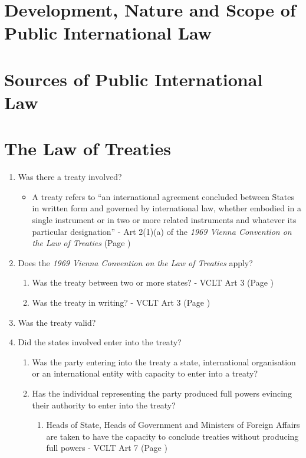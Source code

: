 \section{Development, Nature and Scope of Public International Law}

\section{Sources of Public International Law}

\section{The Law of Treaties}
\begin{enumerate}
    \item Was there a treaty involved?
    \begin{itemize}
        \item A treaty refers to ``an international agreement concluded between States in written form and governed by international law, whether embodied in a single instrument or in two or more related instruments and whatever its particular designation'' - Art 2(1)(a) of the \textit{1969 Vienna Convention on the Law of Treaties} (Page \pageref{VCLT Art 2})
    \end{itemize}
    \item Does the \textit{1969 Vienna Convention on the Law of Treaties} apply?
    \begin{enumerate}
        \item Was the treaty between two or more states? - VCLT Art 3 (Page \pageref{VCLT Art 3})
        \item Was the treaty in writing? - VCLT Art 3 (Page \pageref{VCLT Art 3})
    \end{enumerate}
    \item Was the treaty valid?
    \item Did the states involved enter into the treaty?
    \begin{enumerate}
        \item Was the party entering into the treaty a state, international organisation or an international entity with capacity to enter into a treaty?
        \item Has the individual representing the party produced full powers evincing their authority to enter into the treaty?
        \begin{enumerate}
            \item Heads of State, Heads of Government and Ministers of Foreign Affairs are taken to have the capacity to conclude treaties without producing full powers - VCLT Art 7 (Page \pageref{VCLT Art 7})

\end{enumerate}
\end{enumerate}
\end{enumerate}
